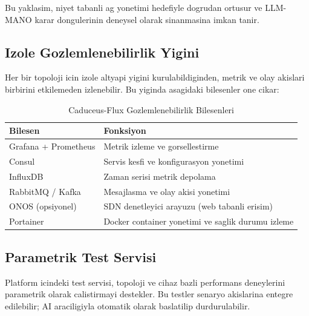 \documentclass[conference]{IEEEtran}
\begin{document}
Bu yaklasim, niyet tabanli ag yonetimi hedefiyle dogrudan ortusur ve LLM-MANO karar dongulerinin deneysel olarak sinanmasina imkan tanir.

\subsection{Izole Gozlemlenebilirlik Yigini}
Her bir topoloji icin izole altyapi yigini kurulabildiginden, metrik ve olay akislari birbirini etkilemeden izlenebilir. Bu yiginda asagidaki bilesenler one cikar:
\begin{table}[htbp]
\caption{Caduceus-Flux Gozlemlenebilirlik Bilesenleri}
\label{tab:obs_components}
\centering
\small
\begin{tabularx}{\linewidth}{l Y}
\toprule
\textbf{Bilesen} & \textbf{Fonksiyon} \\
\midrule
Grafana + Prometheus & Metrik izleme ve gorsellestirme \\
Consul & Servis kesfi ve konfigurasyon yonetimi \\
InfluxDB & Zaman serisi metrik depolama \\
RabbitMQ / Kafka & Mesajlasma ve olay akisi yonetimi \\
ONOS (opsiyonel) & SDN denetleyici arayuzu (web tabanli erisim) \\
Portainer & Docker container yonetimi ve saglik durumu izleme \\
\bottomrule
\end{tabularx}
\end{table}

\subsection{Parametrik Test Servisi}
Platform icindeki test servisi, topoloji ve cihaz bazli performans deneylerini parametrik olarak calistirmayi destekler. Bu testler senaryo akislarina entegre edilebilir; AI araciligiyla otomatik olarak baslatilip durdurulabilir.
\end{document}
